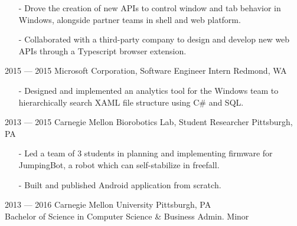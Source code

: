 \documentclass[print]{template/friggeri-cv}
\begin{document}
\begin{entrylist}
{\begin{itemize}[leftmargin=*,itemsep=4pt]
                \item[-] Drove the creation of new APIs to control window and tab behavior in Windows, alongside partner teams in shell and web platform.
                \item[-] Collaborated with a third-party company to design and develop new web APIs through a Typescript browser extension.
             \end{itemize}}
        \entry
            {2015 --- 2015}
            {Microsoft Corporation, {\normalfont Software Engineer Intern}}
            {Redmond, WA}
            {\begin{itemize}[leftmargin=*,itemsep=4pt]
                \item[-] Designed and implemented an analytics tool for the Windows team to hierarchically search XAML file structure using C\# and SQL.
             \end{itemize}}
        \entry
            {2013 --- 2015}
            {Carnegie Mellon Biorobotics Lab, {\normalfont Student Researcher}}
            {Pittsburgh, PA}
            {\begin{itemize}[leftmargin=*,itemsep=4pt]
                \item[-] Led a team of 3 students in planning and implementing firmware for JumpingBot, a robot which can self-stabilize in freefall.
                \item[-] Built and published Android application from scratch.
             \end{itemize}}
        \entry
            {2013 --- 2016}
            {Carnegie Mellon University}
            {Pittsburgh, PA}
            {\\ Bachelor of Science in Computer Science \& Business Admin. Minor}
    \end{entrylist}
\end{document}
